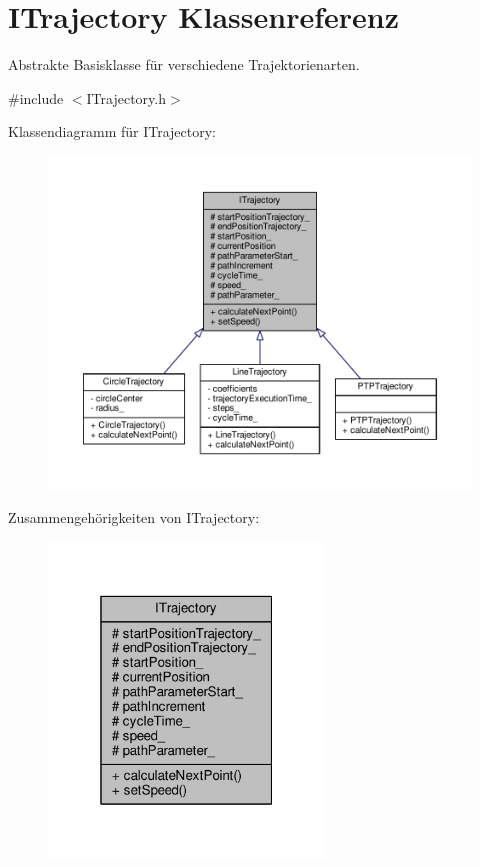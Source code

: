\hypertarget{classITrajectory}{\section{I\-Trajectory Klassenreferenz}
\label{classITrajectory}
}


Abstrakte Basisklasse für verschiedene Trajektorienarten.  




{\ttfamily \#include $<$I\-Trajectory.\-h$>$}



Klassendiagramm für I\-Trajectory\-:
\nopagebreak
\begin{figure}[H]
\begin{center}
\leavevmode
\includegraphics[width=350pt]{classITrajectory__inherit__graph}
\end{center}
\end{figure}


Zusammengehörigkeiten von I\-Trajectory\-:
\nopagebreak
\begin{figure}[H]
\begin{center}
\leavevmode
\includegraphics[width=208pt]{classITrajectory__coll__graph}
\end{center}
\end{figure}
